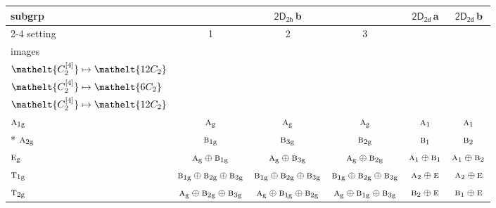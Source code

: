 \documentclass[10pt,a4paper]{article}
\numberwithin{equation}{section}
\newcommand{\eltfont}[1]{{\let\sigma\eltsigma\mathelt{#1}}}
\newcommand{\grp}[1]{\mathsf{#1}}
\newcommand{\irr}[1]{\text{\normalfont\scshape #1}}
\newcommand{\cls}[1]{\eltfont{#1}}
\newcommand{\ptag}[1]{\mathrm{#1}}
\newcommand{\clsletter}[1]{\,{\scriptsize\color{black!55}#1}}
\newcommand{\genidx}[2]{#1^{[\mathrm{#2}]}}
\begin{document}
{\small\begin{longtable}{@{}lccccc@{}}\toprule
subgrp & \multicolumn{3}{c}{\href{2D2h.pdf}{$\grp{2D_{2h}}$}\clsletter{b}} & \href{2D2d.pdf}{$\grp{2D_{2d}}$}\clsletter{a} & \href{2D2d.pdf}{$\grp{2D_{2d}}$}\clsletter{b}\\\cmidrule(lr){2-4}
setting & 1 & 2 & 3 &  & \\
images & {\scriptsize\begin{tabular}[t]{@{}c@{}}$\cls{\genidx{C_{2}}{2}} \mapsto \cls{6C_{2}}$\\$\cls{\genidx{C_{2}}{4}} \mapsto \cls{12C_{2}}$\end{tabular}} & {\scriptsize\begin{tabular}[t]{@{}c@{}}$\cls{\genidx{C_{2}}{2}} \mapsto \cls{12C_{2}}$\\$\cls{\genidx{C_{2}}{4}} \mapsto \cls{6C_{2}}$\end{tabular}} & {\scriptsize\begin{tabular}[t]{@{}c@{}}$\cls{\genidx{C_{2}}{2}} \mapsto \cls{12C_{2}}$\\$\cls{\genidx{C_{2}}{4}} \mapsto \cls{12C_{2}}$\end{tabular}} &  & \\\midrule\endhead
\bottomrule\endfoot\endlastfoot
$\irr{a}_{1\ptag{g}}$ & $\irr{a}_{\ptag{g}}$ & $\irr{a}_{\ptag{g}}$ & $\irr{a}_{\ptag{g}}$ & $\irr{a}_{1}$ & $\irr{a}_{1}$\\*
$\irr{a}_{2\ptag{g}}$ & $\irr{b}_{1\ptag{g}}$ & $\irr{b}_{3\ptag{g}}$ & $\irr{b}_{2\ptag{g}}$ & $\irr{b}_{1}$ & $\irr{b}_{2}$\\
$\irr{e}_{\ptag{g}}$ & $\irr{a}_{\ptag{g}}\oplus \irr{b}_{1\ptag{g}}$ & $\irr{a}_{\ptag{g}}\oplus \irr{b}_{3\ptag{g}}$ & $\irr{a}_{\ptag{g}}\oplus \irr{b}_{2\ptag{g}}$ & $\irr{a}_{1}\oplus \irr{b}_{1}$ & $\irr{a}_{1}\oplus \irr{b}_{2}$\\
$\irr{t}_{1\ptag{g}}$ & $\irr{b}_{1\ptag{g}}\oplus \irr{b}_{2\ptag{g}}\oplus \irr{b}_{3\ptag{g}}$ & $\irr{b}_{1\ptag{g}}\oplus \irr{b}_{2\ptag{g}}\oplus \irr{b}_{3\ptag{g}}$ & $\irr{b}_{1\ptag{g}}\oplus \irr{b}_{2\ptag{g}}\oplus \irr{b}_{3\ptag{g}}$ & $\irr{a}_{2}\oplus \irr{e}$ & $\irr{a}_{2}\oplus \irr{e}$\\
$\irr{t}_{2\ptag{g}}$ & $\irr{a}_{\ptag{g}}\oplus \irr{b}_{2\ptag{g}}\oplus \irr{b}_{3\ptag{g}}$ & $\irr{a}_{\ptag{g}}\oplus \irr{b}_{1\ptag{g}}\oplus \irr{b}_{2\ptag{g}}$ & $\irr{a}_{\ptag{g}}\oplus \irr{b}_{1\ptag{g}}\oplus \irr{b}_{3\ptag{g}}$ & $\irr{b}_{2}\oplus \irr{e}$ & $\irr{b}_{1}\oplus \irr{e}$\\

\end{longtable}}
\end{document}
